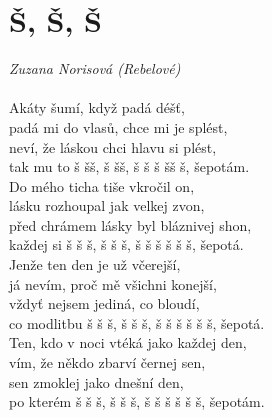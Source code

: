 \section*{\Huge Š, Š, Š}
\emph{Zuzana Norisová (Rebelové)}\\

\\

Akáty šumí, když padá déšť,\\
padá mi do vlasů, chce mi je splést,\\
neví, že láskou chci hlavu si plést,\\
tak mu to š š\hspace{0.8cm}š, š š\hspace{0.8cm}š,
š š š šš š, šepotám.\\

Do mého ticha tiše vkročil on,\\
lásku rozhoupal jak velkej zvon,\\
před chrámem lásky byl bláznivej shon,\\
každej si š š š, š š š, š š š š š š, šepotá.\\

Jenže ten den je už včerejší,\\
já nevím, proč mě všichni konejší,\\
vždyť nejsem jediná, co bloudí,\\
co modlitbu š š š, š š š, š š š š š š, šepotá.\\

Ten, kdo v noci vtéká jako každej den,\\
vím, že někdo zbarví černej sen,\\
sen zmoklej jako dnešní den,\\
po kterém š š š, š š š, š š š š š š, šepotám.\\

\newpage
